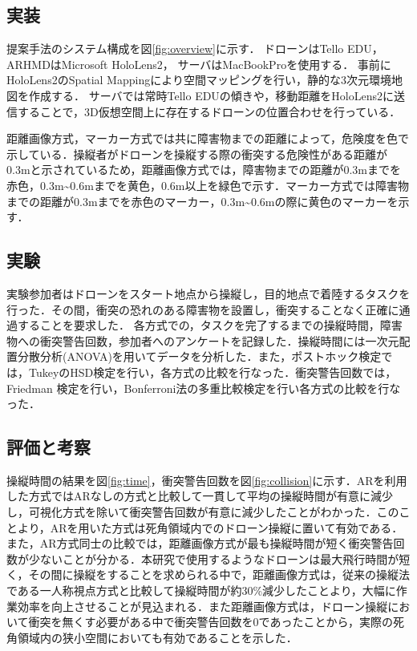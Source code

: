 \documentclass[a4paper,10pt,twocolumn,upLatex]{jsarticle}
\begin{document}
\subsection{実装}
提案手法のシステム構成を図\ref{fig:overview}に示す．
ドローンはTello EDU，
ARHMDはMicrosoft HoloLens2，
サーバはMacBookProを使用する．
事前にHoloLens2のSpatial Mappingにより空間マッピングを行い，静的な3次元環境地図を作成する．
サーバでは常時Tello EDUの傾きや，移動距離をHoloLens2に送信することで，3D仮想空間上に存在するドローンの位置合わせを行っている．
\par
距離画像方式，マーカー方式では共に障害物までの距離によって，危険度を色で示している．操縦者がドローンを操縦する際の衝突する危険性がある距離が0.3mと示されている\cite{obstruct}ため，距離画像方式では，障害物までの距離が0.3mまでを赤色，0.3m\textasciitilde0.6mまでを黄色，0.6m以上を緑色で示す．マーカー方式では障害物までの距離が0.3mまでを赤色のマーカー，0.3m\textasciitilde 0.6mの際に黄色のマーカーを示す．


\subsection{実験}
実験参加者はドローンをスタート地点から操縦し，目的地点で着陸するタスクを行った．その間，衝突の恐れのある障害物を設置し，衝突することなく正確に通過することを要求した．
各方式での，タスクを完了するまでの操縦時間，障害物への衝突警告回数，参加者へのアンケートを記録した．操縦時間には一次元配置分散分析(ANOVA)を用いてデータを分析した．また，ポストホック検定では，TukeyのHSD検定を行い，各方式の比較を行なった．衝突警告回数では，Friedman 検定を行い，Bonferroni法の多重比較検定を行い各方式の比較を行なった．


\subsection{評価と考察}
操縦時間の結果を図\ref{fig:time}，衝突警告回数を図\ref{fig:collision}に示す．ARを利用した方式ではARなしの方式と比較して一貫して平均の操縦時間が有意に減少し，可視化方式を除いて衝突警告回数が有意に減少したことがわかった．このことより，ARを用いた方式は死角領域内でのドローン操縦に置いて有効である．また，AR方式同士の比較では，距離画像方式が最も操縦時間が短く衝突警告回数が少ないことが分かる．本研究で使用するようなドローンは最大飛行時間が短く，その間に操縦をすることを求められる中で，距離画像方式は，従来の操縦法である一人称視点方式と比較して操縦時間が約30\%減少したことより，大幅に作業効率を向上させることが見込まれる．また距離画像方式は，ドローン操縦において衝突を無くす必要がある中で衝突警告回数を0であったことから，実際の死角領域内の狭小空間においても有効であることを示した．
\end{document}
